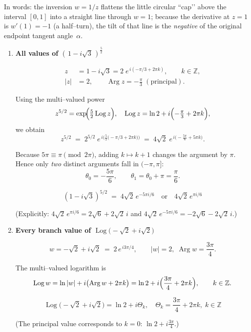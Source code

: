 \documentclass[12pt]{article}
\DeclareMathOperator{\Log}{Log}
\DeclareMathOperator{\Arg}{Arg}
\theoremstyle{definition} %
\theoremstyle{plain} %
\begin{document}
  \noindent
  In words: the inversion \(w=1/z\) flattens the
  little circular “cap’’ above the interval \([0,1]\) into a straight
  line through \(w=1\); because the derivative at \(z=1\) is
  \(w'(1)=-1\) (a half–turn), the tilt of that line is the
  \emph{negative} of the original endpoint tangent angle~\(\alpha\).
  \pagebreak
  \begin{enumerate}[label=\textbf{(\alph*)}]
    \item \textbf{All values of $\displaystyle (\,1-i\sqrt3\,)^{\tfrac52}$}
    
    \begin{align*}
    z &= 1-i\sqrt3
          = 2\;e^{\,i(-\pi/3+2\pi k)},\qquad k\in\mathbb Z,\\[2mm]
    |z| &= 2, \qquad\Arg z = -\frac{\pi}{3}\;(\text{principal}).
    \end{align*}
    
    Using the multi–valued power
    \[
    z^{5/2}= \exp\!\Bigl(\tfrac52\Log z\Bigr),
    \quad
    \Log z = \ln 2 + i\Bigl(-\tfrac{\pi}{3}+2\pi k\Bigr),
    \]
    we obtain
    \[
    z^{5/2}
      \;=\;
      2^{5/2}\;
      e^{\,i\bigl(\tfrac52\bigl(-\pi/3+2\pi k\bigr)\bigr)}
      \;=\;
      4\sqrt2\;
      e^{\,i\bigl(-\tfrac{5\pi}{6}+5\pi k\bigr)} .
    \]
    
    Because $5\pi\equiv\pi\pmod{2\pi}$, adding $k\mapsto k+1$ changes the
    argument by $\pi$.  Hence only \emph{two} distinct arguments fall in
    $(-\pi,\pi]$:
    \[
    \theta_0=-\frac{5\pi}{6},\qquad
    \theta_1=\theta_0+\pi=\frac{\pi}{6}.
    \]
    
    \[
    \boxed{\;
    (1-i\sqrt3)^{5/2}
        \;=\;
        4\sqrt2\,e^{-5\pi i/6}
        \quad\text{or}\quad
        4\sqrt2\,e^{\pi i/6}
    \;}
    \]
    
    (Explicitly:
    $4\sqrt2\,e^{\pi i/6}=2\sqrt6+2\sqrt2\,i$ and
    $4\sqrt2\,e^{-5\pi i/6}=-2\sqrt6-2\sqrt2\,i$.)
    
    \item \textbf{Every branch value of $\displaystyle \Log\!\bigl(-\sqrt2+i\sqrt2\bigr)$}
    
    \[
    w=-\sqrt2+i\sqrt2
        \;=\;
        2\,e^{\,i3\pi/4},
    \qquad
    |w|=2,\;
    \Arg w = \frac{3\pi}{4}.
    \]
    
    The multi–valued logarithm is
    \[
    \Log w
       = \ln|w| + i\bigl(\Arg w + 2\pi k\bigr)
       = \ln 2 + i\Bigl(\frac{3\pi}{4}+2\pi k\Bigr),
       \qquad k\in\mathbb Z.
    \]
    
    \[
    \boxed{\;
       \Log\!\bigl(-\sqrt2+i\sqrt2\bigr)
       =\ln 2 + i\Theta_k,
       \quad
       \Theta_k= \frac{3\pi}{4}+2\pi k,
       \;k\in\mathbb Z
    \;}
    \]
    
    (The principal value corresponds to $k=0$: $\displaystyle \ln 2 +
    i\frac{3\pi}{4}$.)
    \end{enumerate}
\end{document}
